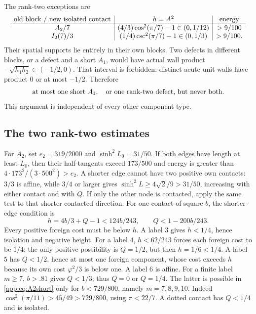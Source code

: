 \documentclass[11pt]{article}
\theoremstyle{definition}
\theoremstyle{remark}
\newcommand{\ph}{\varphi}
\begin{document}
The rank-two exceptions are
\begin{equation}\label{app:eq:defects}
\begin{array}{c|c|c}
\hbox{old block / new isolated contact} & h=A^2 & \hbox{energy}\\ \hline
A_2/7 & (4/3)\cos^2(\pi/7)-1\in(0,1/12) & >9/100\\
I_2(7)/3 & (1/4)\csc^2(\pi/7)-1\in(0,1/3) & >9/100.
\end{array}
\end{equation}
Their spatial supports lie entirely in their own blocks.
Two defects in different blocks, or a defect and a short $A_1$,
would have actual wall product $-\sqrt{h_1h_2}\in(-1/2,0)$.
That interval is forbidden: distinct acute unit walls have product
$0$ or at most $-1/2$. Therefore
\begin{equation}\label{app:eq:debits}
\text{at most one short }A_1,\quad\hbox{or one rank-two defect,
but never both.}
\end{equation}
This argument is independent of every other component type.

\subsection{The two rank-two estimates}

For $A_2$, set $e_2=319/2000$ and $\sinh^2L_0=31/50$.
If both edges have length at least $L_0$, then their half-tangents
exceed $173/500$ and energy is greater than
$4\cdot173^2/(3\cdot500^2)>e_2$. A shorter edge cannot have two
positive own contacts: $3/3$ is affine, while $3/4$ or larger gives
$\sinh^2L\ge4\sqrt2/9>31/50$, increasing with either contact
and with $Q$. If only the other node is contacted, apply the same
test to that shorter contacted direction. For one contact of square
$b$, the shorter-edge condition is
\begin{equation}\label{app:eq:A2short}
 h=4b/3+Q-1<124b/243,\qquad Q<1-200b/243.
\end{equation}
Every positive foreign cost must be below $h$. A label $3$ gives
$h<1/4$, hence isolation and negative height. For a label $4$,
$h<62/243$ forces each foreign cost to be $1/4$; the only positive
possibility is $Q=1/2$, but then $h=1/6<1/4$. A label $5$ has
$Q<1/2$, hence at most one foreign component, whose cost exceeds
$h$ because its own cost $\ph^2/3$ is below one. A label $6$ is
affine. For a finite label $m\ge7$, $b>.81$ gives $Q<1/3$;
thus $Q=0$ or $Q=1/4$. The latter is possible in
\eqref{app:eq:A2short} only for $b<729/800$, namely $m=7,8,9,10$.
Indeed $\cos^2(\pi/11)>45/49>729/800$, using $\pi<22/7$.
A dotted contact has $Q<1/4$ and is isolated.
\end{document}
